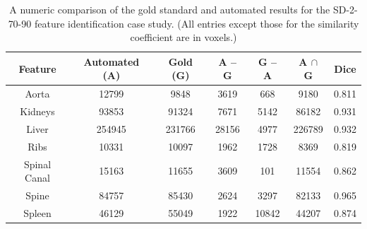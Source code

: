 \begin{table}[p]
\begin{center}
\begin{tabular}{c|cccccc}
\footnotesize \textbf{Feature} & \footnotesize \textbf{Automated (A)} & \footnotesize \textbf{Gold (G)} & \footnotesize \textbf{A -- G} & \footnotesize \textbf{G -- A} & \footnotesize \textbf{A $\cap$ G} & \footnotesize \textbf{Dice} \\
\hline
\footnotesize Aorta & \footnotesize 12799 & \footnotesize 9848 & \footnotesize 3619 & \footnotesize 668 & \footnotesize 9180 & \footnotesize 0.811 \\
\footnotesize Kidneys & \footnotesize 93853 & \footnotesize 91324 & \footnotesize 7671 & \footnotesize 5142 & \footnotesize 86182 & \footnotesize 0.931 \\
\footnotesize Liver & \footnotesize 254945 & \footnotesize 231766 & \footnotesize 28156 & \footnotesize 4977 & \footnotesize 226789 & \footnotesize 0.932 \\
\footnotesize Ribs & \footnotesize 10331 & \footnotesize 10097 & \footnotesize 1962 & \footnotesize 1728 & \footnotesize 8369 & \footnotesize 0.819 \\
\footnotesize Spinal Canal & \footnotesize 15163 & \footnotesize 11655 & \footnotesize 3609 & \footnotesize 101 & \footnotesize 11554 & \footnotesize 0.862 \\
\footnotesize Spine & \footnotesize 84757 & \footnotesize 85430 & \footnotesize 2624 & \footnotesize 3297 & \footnotesize 82133 & \footnotesize 0.965 \\
\footnotesize Spleen & \footnotesize 46129 & \footnotesize 55049 & \footnotesize 1922 & \footnotesize 10842 & \footnotesize 44207 & \footnotesize 0.874 \\
\end{tabular}
\end{center}
\caption{A numeric comparison of the gold standard and automated results for the SD-2-70-90 feature identification case study. (All entries except those for the similarity coefficient are in voxels.)}
\label{tbl:validation-SD-2-70-90}
\end{table}

